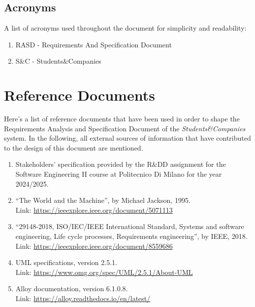 \subsection{Acronyms}

A list of acronyms used throughout the document for simplicity and readability:

\begin{enumerate}
    \item RASD - Requirements And Specification Document
    \item S\&C - Students\&Companies
\end{enumerate}

\newpage
\section{Reference Documents}

Here’s a list of reference documents that have been used in order to shape the Requirements Analysis and Specification Document of the \textit{Students\&Companies} system. In the following, all external sources of information that have contributed to the design of this document are mentioned.

\begin{enumerate}
    \item Stakeholders’ specification provided by the R\&DD assignment for the Software Engineering II course at Politecnico Di Milano for the year 2024/2025.
    \item ``The World and the Machine'', by Michael Jackson, 1995. \\
    Link: \url{https://ieeexplore.ieee.org/document/5071113}
    \item ``29148-2018, ISO/IEC/IEEE International Standard, Systems and software engineering, Life cycle processes, Requirements engineering'', by IEEE, 2018. \\
    Link: \url{https://ieeexplore.ieee.org/document/8559686}
    \item UML specifications, version 2.5.1. \\
    Link: \url{https://www.omg.org/spec/UML/2.5.1/About-UML}
    \item Alloy documentation, version 6.1.0.8. \\
    Link: \url{https://alloy.readthedocs.io/en/latest/}
\end{enumerate}

